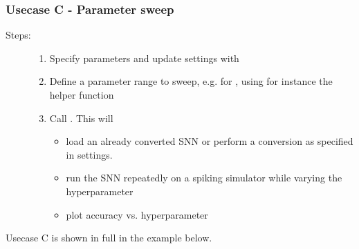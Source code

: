 \documentclass[letterpaper,10pt,english]{sphinxmanual}
\begin{document}
\subsubsection{Usecase C - Parameter sweep}
\label{getting_started:parameter-sweep}\label{getting_started:usecase-c-parameter-sweep}\begin{description}
\item[{Steps:}] \leavevmode\begin{enumerate}
\item {} 
Specify parameters and update settings with 

\item {} 
Define a parameter range to sweep, e.g. for , using for
instance the helper function 

\item {} 
Call . This will
\begin{itemize}
\item {} 
load an already converted SNN or perform a conversion as specified in
settings.

\item {} 
run the SNN repeatedly on a spiking simulator while varying the
hyperparameter

\item {} 
plot accuracy vs. hyperparameter

\end{itemize}

\end{enumerate}

\end{description}

Usecase C is shown in full in the example below.
\end{document}
